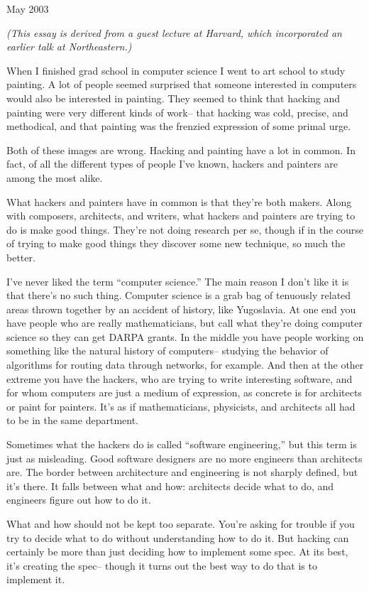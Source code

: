 May 2003

\emph{(This essay is derived from a guest lecture at Harvard, which
incorporated an earlier talk at Northeastern.)}

When I finished grad school in computer science I went to art school to
study painting. A lot of people seemed surprised that someone interested
in computers would also be interested in painting. They seemed to think
that hacking and painting were very different kinds of work-- that
hacking was cold, precise, and methodical, and that painting was the
frenzied expression of some primal urge.

Both of these images are wrong. Hacking and painting have a lot in
common. In fact, of all the different types of people I've known,
hackers and painters are among the most alike.

What hackers and painters have in common is that they're both makers.
Along with composers, architects, and writers, what hackers and painters
are trying to do is make good things. They're not doing research per se,
though if in the course of trying to make good things they discover some
new technique, so much the better.

I've never liked the term ``computer science.'' The main reason I don't
like it is that there's no such thing. Computer science is a grab bag of
tenuously related areas thrown together by an accident of history, like
Yugoslavia. At one end you have people who are really mathematicians,
but call what they're doing computer science so they can get DARPA
grants. In the middle you have people working on something like the
natural history of computers-- studying the behavior of algorithms for
routing data through networks, for example. And then at the other
extreme you have the hackers, who are trying to write interesting
software, and for whom computers are just a medium of expression, as
concrete is for architects or paint for painters. It's as if
mathematicians, physicists, and architects all had to be in the same
department.

Sometimes what the hackers do is called ``software engineering,'' but
this term is just as misleading. Good software designers are no more
engineers than architects are. The border between architecture and
engineering is not sharply defined, but it's there. It falls between
what and how: architects decide what to do, and engineers figure out how
to do it.

What and how should not be kept too separate. You're asking for trouble
if you try to decide what to do without understanding how to do it. But
hacking can certainly be more than just deciding how to implement some
spec. At its best, it's creating the spec-- though it turns out the best
way to do that is to implement it.

